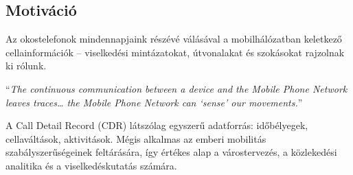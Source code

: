 \subsection{Motiváció}

Az okostelefonok mindennapjaink részévé válásával a mobilhálózatban keletkező cellainformációk -- viselkedési mintázatokat, útvonalakat és szokásokat rajzolnak ki rólunk.

\enquote{\textit{The continuous communication between a device and the Mobile Phone Network leaves traces… the Mobile Phone Network can ‘sense’ our movements.}}%
\cite{pinter2021evaluating}

A Call Detail Record (CDR) látszólag egyszerű adatforrás: időbélyegek, cellaváltások, aktivitások. Mégis alkalmas az emberi mobilitás szabályszerűségeinek feltárására, így értékes alap a várostervezés, a közlekedési analitika és a viselkedéskutatás számára.







